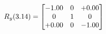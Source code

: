 \documentclass[preview]{standalone}
\begin{document}
\begin{align*}
\special{dvisvgm:raw <g id='unique000'>}R_{y}(3.14) = \begin{bmatrix}-1.00 & 0 & +0.00 \\0 & 1 & 0 \\+0.00 & 0 & -1.00\end{bmatrix}\special{dvisvgm:raw </g>}
\end{align*}
\end{document}
